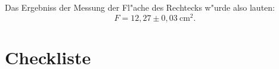 Das Ergebniss der Messung der Fl"ache des Rechtecks w"urde also lauten:
\begin{equation*}
	F = 12,27 \pm 0,03~\mathrm{cm^2}.
\end{equation*}




\section{Checkliste}

